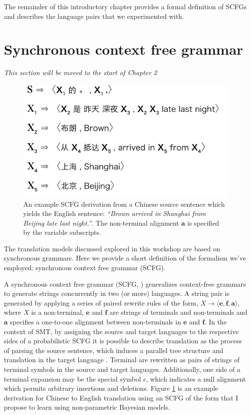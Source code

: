 The remainder of this introductory chapter provides a formal definition of SCFGs and describes the language pairs that we experimented with.

\section{Synchronous context free grammar} \label{sec:scfg}
{\em This section will be moved to the start of Chapter 2}

\begin{figure}[t]
\begin{center}
\includegraphics[width=0.6\columnwidth]{example_derivation2.pdf}
\end{center}
\caption[Derivation]{An example SCFG derivation from a Chinese source sentence which yields the English sentence: {\em ``Brown arrived in Shanghai from Beijing late last night.''}. The non-terminal alignment $\mathbf{a}$ is specified by the variable subscripts.}
\label{fig:intro_example_derivation}
\end{figure}

The translation models discussed explored in this workshop are based on synchronous grammars. 
Here we provide a short definition of the formalism we've employed: synchronous context free grammar (SCFG).

A synchronous context free grammar (SCFG, \cite{lewis68scfg}) generalizes context-free grammars to generate strings concurrently in two (or more) languages. A string pair is generated by applying a series of paired rewrite rules of the form, $X \rightarrow \langle \mathbf{e}, \mathbf{f}, \mathbf{a} \rangle$, where $X$ is a non-terminal, $\mathbf{e}$ and $\mathbf{f}$ are strings of terminals and non-terminals and $\mathbf{a}$ specifies a one-to-one alignment between non-terminals in $\mathbf{e}$ and $\mathbf{f}$.
In the context of SMT, by assigning the source and target languages to the respective sides of a probabilistic SCFG it is possible to describe translation as the process of parsing the source sentence, which induces a parallel tree structure and translation in the target language \cite{chiang07hierarchical}.  
Terminal are rewritten as pairs of strings of terminal symbols in the source and target languages.  Additionally, one side of a terminal expansion may be the special symbol $\epsilon$, which indicates a null alignment which permits arbitrary insertions and deletions.
Figure \ref{fig:intro_example_derivation} is an example derivation for Chinese to English translation using an SCFG of the form that I propose to learn using non-parametric Bayesian models.

